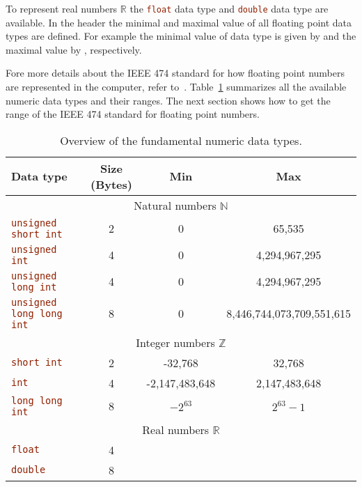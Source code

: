 To represent real numbers $\mathbb{R}$ the \lstinline[language=C++]|float| data type and \lstinline[language=C++]|double| data type are available. In the  header the minimal and maximal value of all floating point data types are defined. For example the minimal value of  data type is given by  and the maximal value by , respectively. 

Fore more details about the IEEE 474 standard for how floating point numbers are represented in the computer, refer to~\cite{4610935,goldberg1991every}. Table~\ref{chapter2:table:datatypes} summarizes all the available numeric data types and their ranges. The next section shows how to get the range of the IEEE 474 standard for floating point numbers.

\begin{table}[h]
\centering
\begin{tabular}{lccc}
\toprule
Data type & Size (Bytes) & Min & Max \\\midrule
\multicolumn{4}{c}{Natural numbers $\mathbb{N}$ }\\\midrule
\lstinline[language=C++]|unsigned short int| & 2 & 0 & 65,535  \\ 
\lstinline[language=C++]|unsigned int| & 4 & 0 & 4,294,967,295 \\ 
\lstinline[language=C++]|unsigned long int| & 4 & 0 & 4,294,967,295 \\ 
\lstinline[language=C++]|unsigned long long int| & 8 & 0 & 8,446,744,073,709,551,615 \\ \midrule
\multicolumn{4}{c}{Integer numbers $\mathbb{Z}$ }\\\midrule
\lstinline[language=C++]|short int| & 2 & -32,768 & 32,768 \\
\lstinline[language=C++]|int| & 4 & -2,147,483,648 & 2,147,483,648 \\
\lstinline[language=C++]|long long int| & 8 & $-2^{63}$ & $2^{63}-1$ \\\midrule
\multicolumn{4}{c}{Real numbers $\mathbb{R}$ }\\\midrule
\lstinline[language=C++]|float| & 4 &  &  \\
\lstinline[language=C++]|double| & 8 &  &  \\
\bottomrule
\end{tabular} 
\caption{Overview of the fundamental numeric data types.}
\label{chapter2:table:datatypes}
\end{table}

